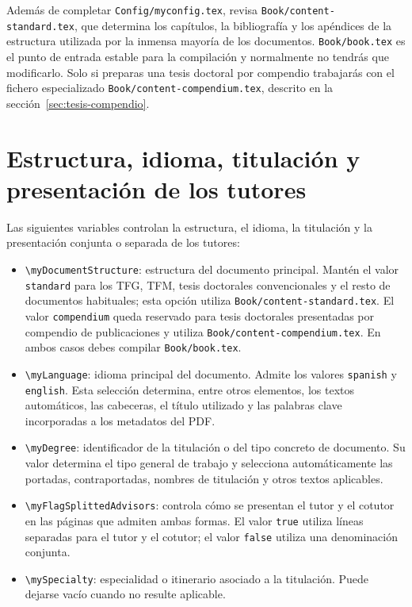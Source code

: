 Además de completar \texttt{Config/myconfig.tex}, revisa \texttt{Book/content-standard.tex}, que determina los capítulos, la bibliografía y los apéndices de la estructura utilizada por la inmensa mayoría de los documentos. \texttt{Book/book.tex} es el punto de entrada estable para la compilación y normalmente no tendrás que modificarlo. Solo si preparas una tesis doctoral por compendio trabajarás con el fichero especializado \texttt{Book/content-compendium.tex}, descrito en la sección~\ref{sec:tesis-compendio}.

\section{Estructura, idioma, titulación y presentación de los tutores}

Las siguientes variables controlan la estructura, el idioma, la titulación y la presentación conjunta o separada de los tutores:

\begin{itemize}
  \item \texttt{\textbackslash{}myDocumentStructure}: estructura del documento principal. Mantén el valor \texttt{standard} para los TFG, TFM, tesis doctorales convencionales y el resto de documentos habituales; esta opción utiliza \texttt{Book/content-standard.tex}. El valor \texttt{compendium} queda reservado para tesis doctorales presentadas por compendio de publicaciones y utiliza \texttt{Book/content-compendium.tex}. En ambos casos debes compilar \texttt{Book/book.tex}.
  \item \texttt{\textbackslash{}myLanguage}: idioma principal del documento. Admite los valores \texttt{spanish} y \texttt{english}. Esta selección determina, entre otros elementos, los textos automáticos, las cabeceras, el título utilizado y las palabras clave incorporadas a los metadatos del PDF.
  \item \texttt{\textbackslash{}myDegree}: identificador de la titulación o del tipo concreto de documento. Su valor determina el tipo general de trabajo y selecciona automáticamente las portadas, contraportadas, nombres de titulación y otros textos aplicables.
  \item \texttt{\textbackslash{}myFlagSplittedAdvisors}: controla cómo se presentan el tutor y el cotutor en las páginas que admiten ambas formas. El valor \texttt{true} utiliza líneas separadas para el tutor y el cotutor; el valor \texttt{false} utiliza una denominación conjunta.
  \item \texttt{\textbackslash{}mySpecialty}: especialidad o itinerario asociado a la titulación. Puede dejarse vacío cuando no resulte aplicable.
\end{itemize}


